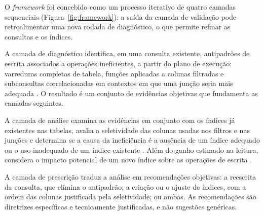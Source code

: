 O \textit{framework} foi concebido como um processo iterativo de quatro camadas sequenciais (Figura~\ref{fig:framework}): a saída da camada de validação pode retroalimentar uma nova rodada de diagnóstico, o que permite refinar as consultas e os índices.

\begin{figure}[!b]
\centering
{}
\end{figure}

A camada de diagnóstico identifica, em uma consulta existente, antipadrões de escrita associados a operações ineficientes, a partir do plano de execução: varreduras completas de tabela, funções aplicadas a colunas filtradas e subconsultas correlacionadas em contextos em que uma junção seria mais adequada \cite{neumann2025unnesting, karwin2010antipatterns}. O resultado é um conjunto de evidências objetivas que fundamenta as camadas seguintes.

A camada de análise examina as evidências em conjunto com os índices já existentes nas tabelas, avalia a seletividade das colunas usadas nos filtros e nas junções e determina se a causa da ineficiência é a ausência de um índice adequado ou o uso inadequado de um índice existente \cite{fritchey2018qpt}. Além do ganho estimado na leitura, considera o impacto potencial de um novo índice sobre as operações de escrita \cite{saidu2024indexing}.

A camada de prescrição traduz a análise em recomendações objetivas: a reescrita da consulta, que elimina o antipadrão; a criação ou o ajuste de índices, com a ordem das colunas justificada pela seletividade; ou ambas. As recomendações são diretrizes específicas e tecnicamente justificadas, e não sugestões genéricas.


